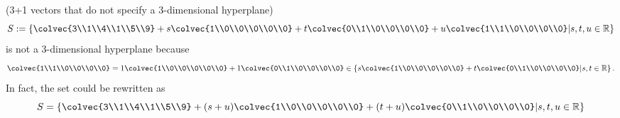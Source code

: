 \begin{example}{(3+1 vectors that do not specify a  3-dimensional hyperplane)}
\[S:=\left\{ \colvec{3\\1\\4\\1\\5\\9} + s\colvec{1\\0\\0\\0\\0\\0} + t\colvec{0\\1\\0\\0\\0\\0} +u \colvec{1\\1\\0\\0\\0\\0}\middle\arrowvert s, t,u \in \mathbb{R} \right\}\] 
is not a 3-dimensional hyperplane because 
\[\colvec{1\\1\\0\\0\\0\\0}=1\colvec{1\\0\\0\\0\\0\\0} + 1\colvec{0\\1\\0\\0\\0\\0} \in  \left\{     s\colvec{1\\0\\0\\0\\0\\0} + t\colvec{0\\1\\0\\0\\0\\0}  \middle\arrowvert  s,t \in \mathbb{R} \right\}.\]
In fact, the set could be rewritten as 
\[S=\left\{ \colvec{3\\1\\4\\1\\5\\9} + (s+u)\colvec{1\\0\\0\\0\\0\\0} + (t+u)\colvec{0\\1\\0\\0\\0\\0} \middle\arrowvert s, t,u \in \mathbb{R} \right\}\]

\end{example}
